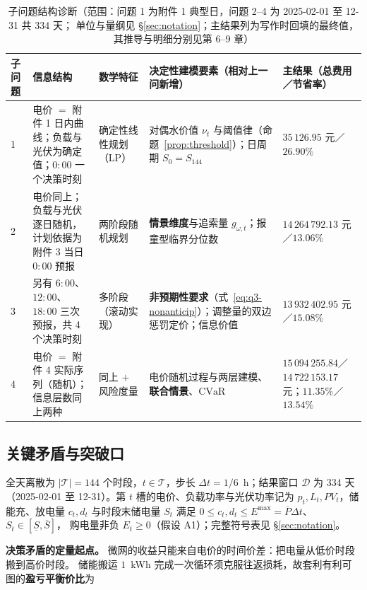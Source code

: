 \begin{table}[htbp]
  \centering
  \caption{子问题结构诊断（范围：问题 1 为附件 1 典型日，问题 2--4 为 2025-02-01 至 12-31 共 334 天；
            单位与量纲见 \S\ref{sec:notation}；主结果列为写作时回填的最终值，
            其推导与明细分别见第 6--9 章）}
  \label{tab:fourq}
  \small
  \setlength{\tabcolsep}{4pt}
  \begin{tabularx}{\linewidth}{C{0.75cm} L{2.30cm} L{2.05cm} L{4.15cm} Y}
    \toprule
    子问题 & 信息结构 & 数学特征 & 决定性建模要素（相对上一问新增） & 主结果（总费用／节省率） \\
     & 电价 \(=\) 附件 1 日内曲线；负载与光伏为确定值；\(0{:}00\) 一个决策时刻
      & 确定性线性规划（LP）
      & 对偶水价值 \(\nu_t\) 与阈值律（命题~\ref{prop:threshold}）；日周期 \(S_0=S_{144}\)
      & \(35\,126.95\) 元／\(26.90\%\) \\
    2 & 电价同上；负载与光伏逐日随机，计划依据为附件 3 当日 \(0{:}00\) 预报
      & 两阶段随机规划
      & \textbf{情景维度}与追索量 \(g_{\omega,t}\)；报童型临界分位数
      & \(14\,264\,792.13\) 元／\(13.06\%\) \\
    3 & 另有 \(6{:}00\)、\(12{:}00\)、\(18{:}00\) 三次预报，共 4 个决策时刻
      & 多阶段（滚动实现）
      & \textbf{非预期性要求}（式~\eqref{eq:q3-nonanticip}）；调整量的双边惩罚定价；信息价值
      & \(13\,932\,402.95\) 元／\(15.08\%\) \\
    4 & 电价 \(=\) 附件 4 实际序列（随机）；信息层数同上两种
      & 同上 \(+\) 风险度量
      & 电价随机过程与两层建模、\textbf{联合情景}、\(\mathrm{CVaR}\)
      & \(15\,094\,255.84\)／\(14\,722\,153.17\) 元；\(11.35\%\)／\(13.54\%\) \\
    \bottomrule
  \end{tabularx}
\end{table}

\subsection{关键矛盾与突破口}

全天离散为 \(|\mathcal T|=144\) 个时段，\(t\in\mathcal T\)，步长 \(\Delta t=1/6\)~h；结果窗口
\(\mathcal D\) 为 334 天（2025-02-01 至 12-31）。第 \(t\) 槽的电价、负载功率与光伏功率记为
\(p_t,L_t,PV_t\)，储能充、放电量 \(c_t,d_t\) 与时段末储电量 \(S_t\) 满足
\(0\le c_t,d_t\le E^{\max}=\overline P\Delta t\)、\(S_t\in[\underline S,\overline S]\)，
购电量非负 \(E_t\ge0\)（假设 A1）；完整符号表见 \S\ref{sec:notation}。

\textbf{决策矛盾的定量起点。} 微网的收益只能来自电价的时间价差：把电量从低价时段搬到高价时段。
储能搬运 \(1\)~kWh 完成一次循环须克服往返损耗，故套利有利可图的\textbf{盈亏平衡价比}为

